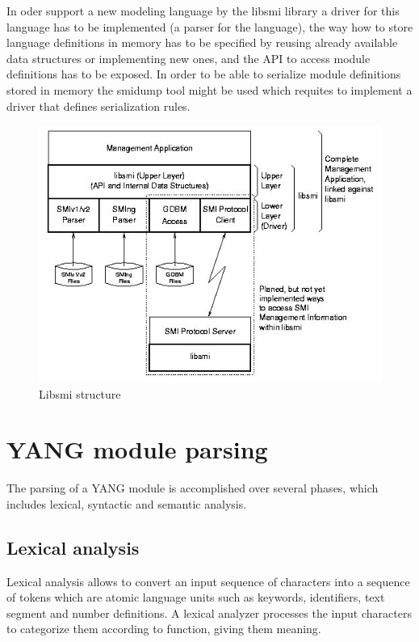 \documentclass[conference]{IEEEtran}
\begin{document}
In oder support a new modeling language by the libsmi library a driver for this language has to be implemented (a parser for the language), the way how to store language definitions in memory has to be specified by reusing already available data structures or implementing new ones, and the API to access module definitions has to be exposed. In order to be able to serialize module definitions stored in memory the smidump tool might be used which requites to implement a driver that defines serialization rules.
\begin{figure}
\begin{center}
\includegraphics[scale=0.50]{libsmi.jpg}
\caption{ Libsmi structure}
\label{fig:libsmi}
\end{center}
\end{figure}

\section{YANG module parsing}
The parsing of a YANG module is accomplished over several phases, which includes lexical, syntactic and semantic analysis.
\subsection{Lexical analysis}
Lexical analysis allows to convert an input sequence of characters into a sequence of tokens which are atomic language units such as keywords, identifiers, text segment and number definitions. A lexical analyzer processes the input characters to categorize them according to function, giving them meaning.
\end{document}
